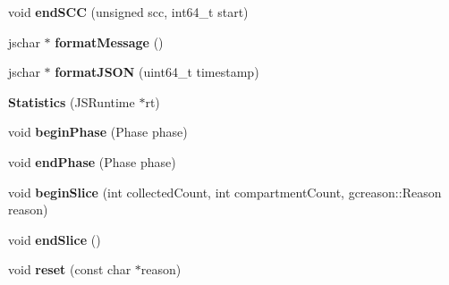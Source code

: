 \begin{DoxyCompactItemize}
\item 
\hypertarget{structjs_1_1gcstats_1_1_statistics_ac4263ad5f5a8de70f1fbaf395f9a79da}{void {\bfseries end\-S\-C\-C} (unsigned scc, int64\-\_\-t start)}\label{structjs_1_1gcstats_1_1_statistics_ac4263ad5f5a8de70f1fbaf395f9a79da}

\item 
\hypertarget{structjs_1_1gcstats_1_1_statistics_a28239af32d0fc1c30890fd88f78a0843}{jschar $\ast$ {\bfseries format\-Message} ()}\label{structjs_1_1gcstats_1_1_statistics_a28239af32d0fc1c30890fd88f78a0843}

\item 
\hypertarget{structjs_1_1gcstats_1_1_statistics_a8354558c67e276b40c167bbf1a331477}{jschar $\ast$ {\bfseries format\-J\-S\-O\-N} (uint64\-\_\-t timestamp)}\label{structjs_1_1gcstats_1_1_statistics_a8354558c67e276b40c167bbf1a331477}

\item 
\hypertarget{structjs_1_1gcstats_1_1_statistics_a9558d1bf65cf0632cf1277e265636e2c}{{\bfseries Statistics} (J\-S\-Runtime $\ast$rt)}\label{structjs_1_1gcstats_1_1_statistics_a9558d1bf65cf0632cf1277e265636e2c}

\item 
\hypertarget{structjs_1_1gcstats_1_1_statistics_a29fd2089732b3cebe16e5cba20b67aa1}{void {\bfseries begin\-Phase} (Phase phase)}\label{structjs_1_1gcstats_1_1_statistics_a29fd2089732b3cebe16e5cba20b67aa1}

\item 
\hypertarget{structjs_1_1gcstats_1_1_statistics_a9cb05d5d2b144c0fec2e77796aa6c37b}{void {\bfseries end\-Phase} (Phase phase)}\label{structjs_1_1gcstats_1_1_statistics_a9cb05d5d2b144c0fec2e77796aa6c37b}

\item 
\hypertarget{structjs_1_1gcstats_1_1_statistics_aabf3e7f9fef914b1a42ca2ae6186e1e0}{void {\bfseries begin\-Slice} (int collected\-Count, int compartment\-Count, gcreason\-::\-Reason reason)}\label{structjs_1_1gcstats_1_1_statistics_aabf3e7f9fef914b1a42ca2ae6186e1e0}

\item 
\hypertarget{structjs_1_1gcstats_1_1_statistics_a388a97382c5a3c673f9ca564a145421d}{void {\bfseries end\-Slice} ()}\label{structjs_1_1gcstats_1_1_statistics_a388a97382c5a3c673f9ca564a145421d}

\item 
\hypertarget{structjs_1_1gcstats_1_1_statistics_a9a9f7de8e8e38511b92653ae3f527ca7}{void {\bfseries reset} (const char $\ast$reason)}\label{structjs_1_1gcstats_1_1_statistics_a9a9f7de8e8e38511b92653ae3f527ca7}


\end{DoxyCompactItemize}
